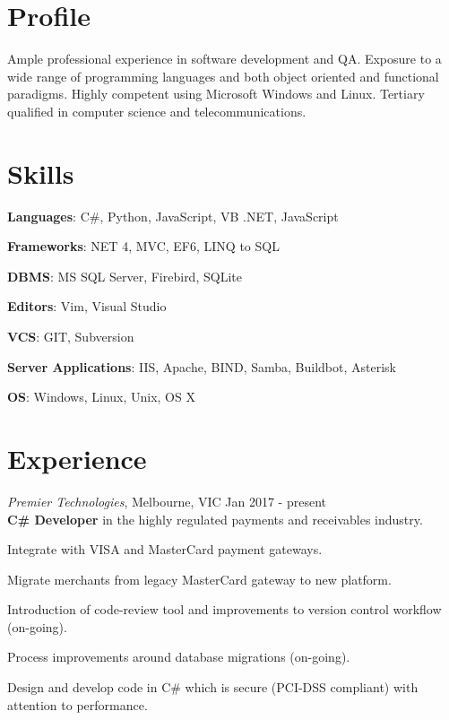 \documentclass[line,margin]{res}
\begin{document}
    \address{ablack@fastmail.net\\ 0401 868 343}
    \address{https://github.com/aablack}

    \begin{resume}
        \section{Profile}
        Ample professional experience in software development and QA.
        Exposure to a wide range of programming languages and both object oriented and functional
        paradigms. Highly competent using Microsoft Windows and Linux. Tertiary qualified in computer
        science and telecommunications.

        \section{Skills}
        \begin{list}{}{\leftmargin=1em \itemsep=-2pt}
            \item{\textbf{Languages}: C\#, Python, JavaScript, VB .NET, JavaScript}
            \item{\textbf{Frameworks}: NET 4, MVC, EF6, LINQ to SQL}
            \item{\textbf{DBMS}: MS SQL Server, Firebird, SQLite}
            \item{\textbf{Editors}: Vim, Visual Studio}
            \item{\textbf{VCS}: GIT, Subversion}
            \item{\textbf{Server Applications}: IIS, Apache, BIND, Samba, Buildbot, Asterisk}
            \item{\textbf{OS}: Windows, Linux, Unix, OS X}
        \end{list}

        \section{Experience}
        \textit{Premier Technologies}, Melbourne, VIC \hfill Jan 2017 - present \\
        \textbf{C\# Developer} in the highly regulated payments and receivables industry.
        \begin{list}{}{\leftmargin=1em \itemsep=-2pt}
            	\item{Integrate with VISA and MasterCard payment gateways.}
            	\item{Migrate merchants from legacy MasterCard gateway to new platform.}
		\item{Introduction of code-review tool and improvements to version control workflow (on-going).}
        	\item{Process improvements around database migrations (on-going).}
        	\item{Design and develop code in C\# which is secure (PCI-DSS compliant) with attention to performance.}
        \end{list}


\end{resume}
\end{document}
